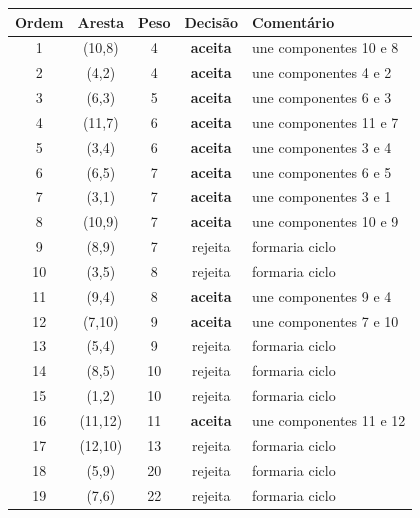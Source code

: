 \begin{footnotesize}
\begin{longtable}{c c c c p{5.5cm}}
\toprule
Ordem & Aresta & Peso & Decis\~ao & Coment\'ario \\
\midrule
\endhead
1 & (10,8) & 4 & \textbf{aceita} & une componentes {10} e {8} \\
2 & (4,2) & 4 & \textbf{aceita} & une componentes {4} e {2} \\
3 & (6,3) & 5 & \textbf{aceita} & une componentes {6} e {3} \\
4 & (11,7) & 6 & \textbf{aceita} & une componentes {11} e {7} \\
5 & (3,4) & 6 & \textbf{aceita} & une componentes {3} e {4} \\
6 & (6,5) & 7 & \textbf{aceita} & une componentes {6} e {5} \\
7 & (3,1) & 7 & \textbf{aceita} & une componentes {3} e {1} \\
8 & (10,9) & 7 & \textbf{aceita} & une componentes {10} e {9} \\
9 & (8,9) & 7 & rejeita & formaria ciclo \\
10 & (3,5) & 8 & rejeita & formaria ciclo \\
11 & (9,4) & 8 & \textbf{aceita} & une componentes {9} e {4} \\
12 & (7,10) & 9 & \textbf{aceita} & une componentes {7} e {10} \\
13 & (5,4) & 9 & rejeita & formaria ciclo \\
14 & (8,5) & 10 & rejeita & formaria ciclo \\
15 & (1,2) & 10 & rejeita & formaria ciclo \\
16 & (11,12) & 11 & \textbf{aceita} & une componentes {11} e {12} \\
17 & (12,10) & 13 & rejeita & formaria ciclo \\
18 & (5,9) & 20 & rejeita & formaria ciclo \\
19 & (7,6) & 22 & rejeita & formaria ciclo \\
\bottomrule
\end{longtable}
\end{footnotesize}

